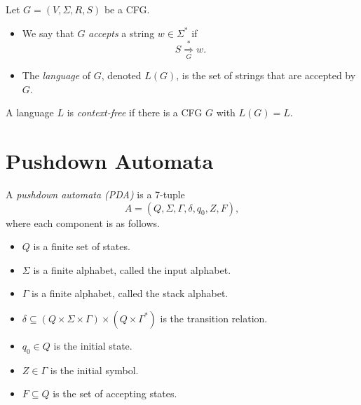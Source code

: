 \begin{definition}
  Let $G = (V, \Sigma, R, S)$ be a CFG.
  \begin{itemize}
    \item We say that $G$ \emph{accepts} a string $w \in \Sigma^*$ if
    \begin{equation*}
      S \mathrel{\mathop\Rightarrow\limits_G^*} w.
    \end{equation*}
    \item The \emph{language} of $G$, denoted $L(G)$, is the set of strings
    that are accepted by $G$.
  \end{itemize}
\end{definition}

\begin{definition}
  A language $L$ is \emph{context-free} if there is a CFG $G$ with $L(G) = L$.
\end{definition}

\section{Pushdown Automata}
\begin{definition}
  A \emph{pushdown automata (PDA)} is a 7-tuple
  \begin{equation*}
    A = (Q, \Sigma, \Gamma, \delta, q_0, Z, F),
  \end{equation*}
  where each component is as follows.
  \begin{itemize}
    \item $Q$ is a finite set of states.
    \item $\Sigma$ is a finite alphabet, called the input alphabet.
    \item $\Gamma$ is a finite alphabet, called the stack alphabet.
    \item $\delta \subseteq (Q \times \Sigma \times \Gamma) \times
    (Q \times \Gamma^*)$ is the transition relation.
    \item $q_0 \in Q$ is the initial state.
    \item $Z \in \Gamma$ is the initial symbol.
    \item $F \subseteq Q$ is the set of accepting states.
  \end{itemize}
\end{definition}

